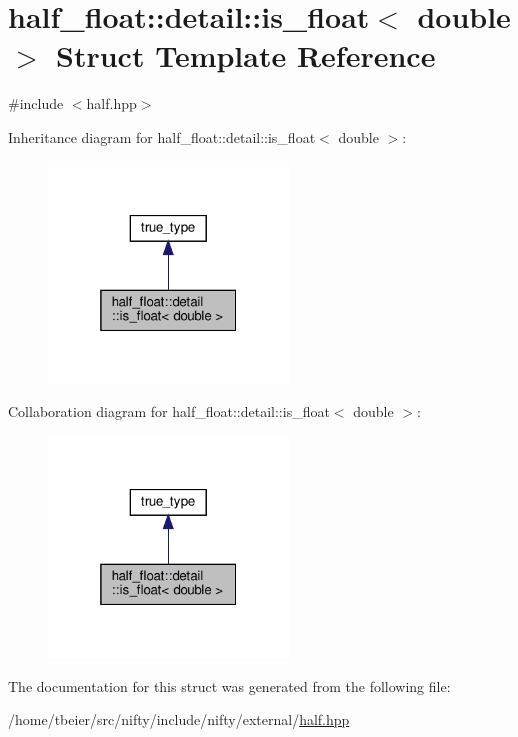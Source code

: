 \hypertarget{structhalf__float_1_1detail_1_1is__float_3_01double_01_4}{}\section{half\+\_\+float\+:\+:detail\+:\+:is\+\_\+float$<$ double $>$ Struct Template Reference}
\label{structhalf__float_1_1detail_1_1is__float_3_01double_01_4}


{\ttfamily \#include $<$half.\+hpp$>$}



Inheritance diagram for half\+\_\+float\+:\+:detail\+:\+:is\+\_\+float$<$ double $>$\+:
\nopagebreak
\begin{figure}[H]
\begin{center}
\leavevmode
\includegraphics[width=181pt]{structhalf__float_1_1detail_1_1is__float_3_01double_01_4__inherit__graph}
\end{center}
\end{figure}


Collaboration diagram for half\+\_\+float\+:\+:detail\+:\+:is\+\_\+float$<$ double $>$\+:
\nopagebreak
\begin{figure}[H]
\begin{center}
\leavevmode
\includegraphics[width=181pt]{structhalf__float_1_1detail_1_1is__float_3_01double_01_4__coll__graph}
\end{center}
\end{figure}


The documentation for this struct was generated from the following file\+:\begin{DoxyCompactItemize}
\item 
/home/tbeier/src/nifty/include/nifty/external/\hyperlink{half_8hpp}{half.\+hpp}\end{DoxyCompactItemize}
